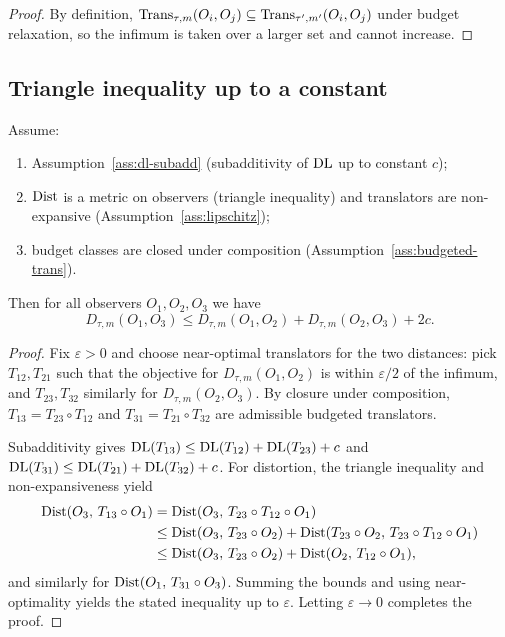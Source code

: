 \documentclass{aion}
\begin{document}
\begin{proof}
By definition, $\operatorname{Trans}_{\tau,m}(O_i,O_j)\subseteq \operatorname{Trans}_{\tau',m'}(O_i,O_j)$ under budget relaxation,
so the infimum is taken over a larger set and cannot increase.
\end{proof}

\subsection{Triangle inequality up to a constant}
\label{subsec:rulial-triangle}

\begin{theorem}\label{thm:rulial-triangle}
Assume:
\begin{enumerate}[leftmargin=*]
  \item Assumption~\ref{ass:dl-subadd} (subadditivity of $\operatorname{DL}$ up to constant $c$);
  \item $\operatorname{Dist}$ is a metric on observers (triangle inequality) and translators are non-expansive
        (Assumption~\ref{ass:lipschitz});
  \item budget classes are closed under composition (Assumption~\ref{ass:budgeted-trans}).
\end{enumerate}
Then for all observers $O_1,O_2,O_3$ we have
\[
  D_{\tau,m}(O_1,O_3) \le D_{\tau,m}(O_1,O_2) + D_{\tau,m}(O_2,O_3) + 2c.
\]
\end{theorem}

\begin{proof}
Fix $\varepsilon>0$ and choose near-optimal translators for the two distances:
pick $T_{12},T_{21}$ such that the objective for $D_{\tau,m}(O_1,O_2)$ is within $\varepsilon/2$ of the infimum,
and $T_{23},T_{32}$ similarly for $D_{\tau,m}(O_2,O_3)$.
By closure under composition, $T_{13}=T_{23}\circ T_{12}$ and $T_{31}=T_{21}\circ T_{32}$
are admissible budgeted translators.

Subadditivity gives $\operatorname{DL}(T_{13})\le\operatorname{DL}(T_{12})+\operatorname{DL}(T_{23})+c$ and
$\operatorname{DL}(T_{31})\le\operatorname{DL}(T_{21})+\operatorname{DL}(T_{32})+c$.
For distortion, the triangle inequality and non-expansiveness yield
\begin{align*}
  \operatorname{Dist}(O_3,\,T_{13}\circ O_1)
    &= \operatorname{Dist}(O_3,\,T_{23}\circ T_{12}\circ O_1)\\
    &\le \operatorname{Dist}(O_3,\,T_{23}\circ O_2) + \operatorname{Dist}(T_{23}\circ O_2,\,T_{23}\circ T_{12}\circ O_1)\\
    &\le \operatorname{Dist}(O_3,\,T_{23}\circ O_2) + \operatorname{Dist}(O_2,\,T_{12}\circ O_1),
\end{align*}
and similarly for $\operatorname{Dist}(O_1,\,T_{31}\circ O_3)$.
Summing the bounds and using near-optimality yields the stated inequality up to $\varepsilon$.
Letting $\varepsilon\to 0$ completes the proof.
\end{proof}
\end{document}
